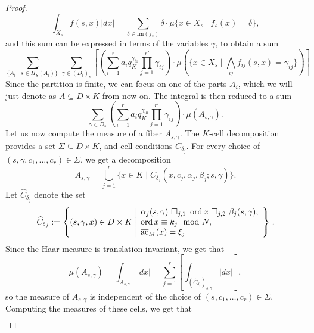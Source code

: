 \begin{proof}
\[ \int_{X_s} {f(s,x)}|dx|
 = \sum_{\delta \in \text{Im}(f_s)} \delta \cdot \mu\{x\in X_s \mid f_s(x) = \delta\},\]
 and this sum can be expressed in terms of the variables $\gamma$, to obtain a sum
\[ \sum_{\{A_i \mid s \in \Pi_S(A_i)\}\  }\sum_{\gamma \in (D_i)_s}  \left[\left(\sum_{i=1}^r a_i q_K^{\gamma_{i0}} \prod_{j=1}^{r'}\gamma_{ij}\right)\cdot \mu\left(\{x\in X_s \mid \bigwedge_{ij} f_{ij}(s,x) = \gamma_{ij}\}\right)\right]\] 
Since the partition is finite, we can focus on one of the parts $A_i$, which we will just denote as $A \subseteq D \times K$ from now on. The integral is then reduced to a sum
\begin{equation}\label{eq:int}
 \sum_{\gamma \in D_s} \left(\sum_{i=1}^r a_i q_K^{\gamma_{i0}} \prod_{j=1}^{r'}\gamma_{ij}\right) \cdot \mu(A_{s,\gamma}).
\end{equation}
Let us now compute the measure of a fiber $A_{s,\gamma}$. The $K$-cell decomposition provides a set $\Sigma \subseteq D \times K$, and cell conditions $C_{\delta_j}$.  For every choice of $(s,\gamma, c_1, \ldots, c_r) \in \Sigma$, we get a decomposition
\[A_{s,\gamma} = \bigcup_{j=1}^r \{x\in K \mid C_{\delta_j}(x,c_j,\alpha_j, \beta_j;s,\gamma)\}.\]
Let $\widehat{C}_{\delta_j}$ denote the set
\[\widehat{C}_{\delta_j}:=\left\{(s, \gamma, x) \in D \times K \left| \begin{array}{l} 
\alpha_j(s,\gamma) \ \square_{j,1}\ \operatorname{ord} x \ \square_{j,2}\ \beta_j(s, \gamma),\\
\operatorname{ord} x \equiv k_j \mod N,\\ {\overline{\rm ac}}_M(x) = \xi_j
\end{array}
\right\}\right..\]
Since the Haar measure is translation invariant, we get that
\[\mu(A_{s,\gamma}) = \int_{A_{s,\gamma}}|dx|
= \sum_{j=1}^r\left[\int_{(\widehat{C}_{\delta_j})_{s,\gamma}}|dx|\right],\]
so the measure of $A_{s,\gamma}$ is independent of the choice of $(s,c_1, \ldots, c_r) \in \Sigma$.
Computing the measures of these cells, we get that
\begin{eqnarray*}

\end{eqnarray*}
\end{proof}
